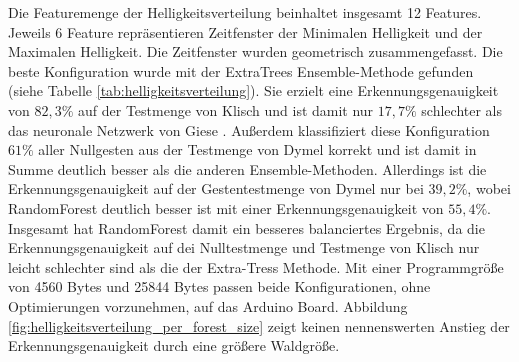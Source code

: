 Die Featuremenge der Helligkeitsverteilung beinhaltet insgesamt 12 Features. Jeweils 6 Feature repräsentieren Zeitfenster der Minimalen Helligkeit und der Maximalen Helligkeit. Die Zeitfenster wurden
geometrisch zusammengefasst.
\newline
\newline
Die beste Konfiguration wurde mit der ExtraTrees Ensemble-Methode gefunden (siehe Tabelle \ref{tab:helligkeitsverteilung}). Sie erzielt eine Erkennungsgenauigkeit von $82,3\%$ auf der Testmenge von Klisch
und ist damit nur $17,7\%$ schlechter als das neuronale Netzwerk von Giese \cite{gieseThesis}. Außerdem klassifiziert diese Konfiguration $61\%$ aller Nullgesten aus der Testmenge von Dymel korrekt und ist
damit in Summe deutlich besser als die anderen Ensemble-Methoden. Allerdings ist die Erkennungsgenauigkeit auf der Gestentestmenge von Dymel nur bei $39,2\%$, wobei RandomForest deutlich besser ist mit
einer Erkennungsgenauigkeit von $55,4\%$. Insgesamt hat RandomForest damit ein besseres balanciertes Ergebnis, da die Erkennungsgenauigkeit auf dei Nulltestmenge und Testmenge von Klisch nur leicht
schlechter sind als die der Extra-Tress Methode. Mit einer Programmgröße von 4560 Bytes und 25844 Bytes passen beide Konfigurationen, ohne Optimierungen vorzunehmen, auf das Arduino Board.
\newline
\newline
Abbildung \ref{fig:helligkeitsverteilung_per_forest_size} zeigt keinen nennenswerten Anstieg der Erkennungsgenauigkeit durch eine größere Waldgröße.

